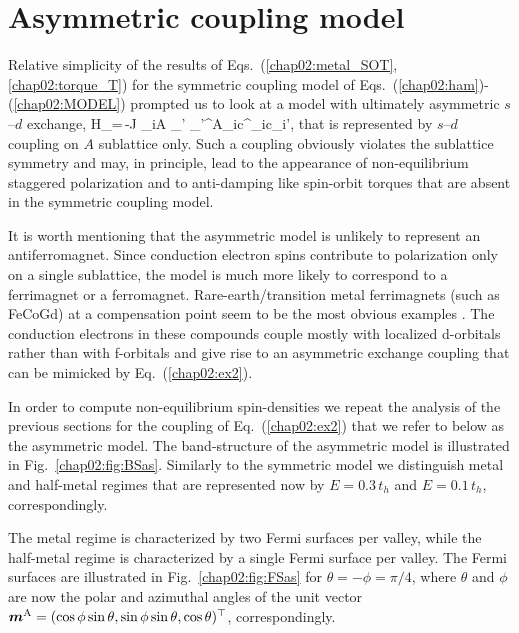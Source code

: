 \section{Asymmetric coupling model} 

Relative simplicity of the results of Eqs.~(\ref{chap02:metal_SOT},\ref{chap02:torque_T}) for the symmetric coupling model of Eqs.~(\ref{chap02:ham})-(\ref{chap02:MODEL}) prompted us to look at a model with ultimately asymmetric $s$--$d$ exchange,
\be
H_=\,-J \s_{i\in A }  \s_{\sigma\sigma'} \bb{\sigma}_{\sigma\sigma'}^\textrm{A}_i\cdot c^\dagger_{i\sigma}c\0_{i\sigma'},
\label{chap02:ex2}
\e
that is represented by $s$--$d$ coupling on $A$ sublattice only. Such a coupling obviously violates the sublattice symmetry and may, in principle, lead to the appearance of non-equilibrium staggered polarization and to anti-damping like spin-orbit torques that are absent in the symmetric coupling model. 

It is worth mentioning that the asymmetric model is unlikely to represent an antiferromagnet. Since conduction electron spins contribute to polarization only on a single sublattice, the model is much more likely to correspond to a ferrimagnet or a ferromagnet.  Rare-earth/transition metal ferrimagnets (such as FeCoGd) at a compensation point seem to be the most obvious examples \cite{jungfleisch_perspectives_2018}. The conduction electrons in these compounds couple mostly with localized d-orbitals rather than with f-orbitals and give rise to an asymmetric exchange coupling that can be mimicked by Eq.~(\ref{chap02:ex2}). 

In order to compute non-equilibrium spin-densities we repeat the analysis of the previous sections for the coupling of Eq.~(\ref{chap02:ex2}) that we refer to below as the asymmetric model. The band-structure of the asymmetric model is illustrated in Fig.~\ref{chap02:fig:BSas}. Similarly to the symmetric model we distinguish metal and half-metal regimes that are represented now by $E=0.3\,t_h$ and $E=0.1\,t_h$, correspondingly. 

The metal regime is characterized by two Fermi surfaces per valley, while the half-metal regime is characterized by a single Fermi surface per valley. The Fermi surfaces are illustrated in Fig.~\ref{chap02:fig:FSas} for $\theta=-\phi=\pi/4$, where $\theta$ and $\phi$ are now the polar and azimuthal angles of the unit vector $\boldsymbol{m}^\textrm{A}=(\cos\phi\sin\theta,\sin\phi\sin\theta,\cos\theta)^\top$, correspondingly. 

